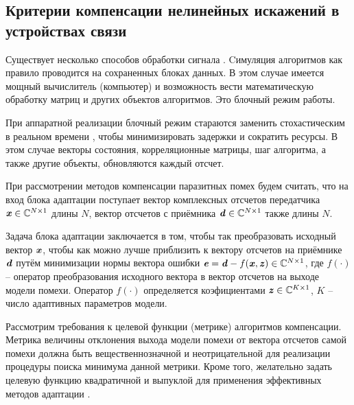 \subsection{Критерии компенсации нелинейных искажений в устройствах связи}

Существует несколько способов обработки сигнала \cite{adapt_filt_haykin}. Cимуляция алгоритмов как правило проводится на сохраненных блоках данных. В этом случае имеется мощный вычислитель (компьютер) и возможность вести математическую обработку матриц и других объектов алгоритмов. Это блочный режим работы.

При аппаратной реализации блочный режим стараются заменить стохастическим в реальном времени \cite{adapt_filt_haykin}, чтобы минимизировать задержки и сократить ресурсы. В этом случае векторы состояния, корреляционные матрицы, шаг алгоритма, а также другие объекты, обновляются каждый отсчет.

При рассмотрении методов компенсации паразитных помех будем считать, что на вход блока адаптации поступает вектор комплексных отсчетов передатчика $\textbf{\textit{x}}\in\mathbb{C}^{N\times1}$ длины $N$, вектор отсчетов с приёмника $\textbf{\textit{d}}\in\mathbb{C}^{N\times1}$ также длины $N$.

Задача блока адаптации заключается в том, чтобы так преобразовать исходный вектор $\textbf{\textit{x}}$, чтобы как можно лучше приблизить к вектору отсчетов на приёмнике $\textbf{\textit{d}}$ путём минимизации нормы вектора ошибки $\textbf{\textit{e}}=\textbf{\textit{d}}-f(\textbf{\textit{x}}, \textbf{\textit{z}})\in\mathbb{C}^{N\times1}$, где $f(\cdot)$ -- оператор преобразования исходного вектора в вектор отсчетов на выходе модели помехи. Оператор $f(\cdot)$ определяется коэфициентами $\textbf{\textit{z}}\in\mathbb{C}^{K\times1}$, $K$ -- число адаптивных параметров модели.

Рассмотрим требования к целевой функции (метрике) алгоритмов компенсации. Метрика величины отклонения выхода модели помехи от вектора отсчетов самой помехи должна быть вещественнозначной и неотрицательной для реализации процедуры поиска минимума данной метрики. Кроме того, желательно задать целевую функцию квадратичной и выпуклой для применения эффективных методов адаптации \cite{convex_opt}.

